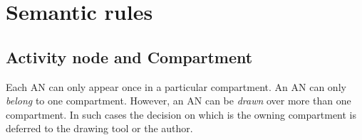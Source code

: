 \section{Semantic rules}



%
%


\subsection{Activity node and Compartment}

Each AN can only appear once in a particular compartment.  An AN can only \emph{belong} to one compartment. However, an AN can be \emph{drawn} over more than one compartment. In such cases the decision on which is the owning compartment is deferred to the drawing tool or the author. 

